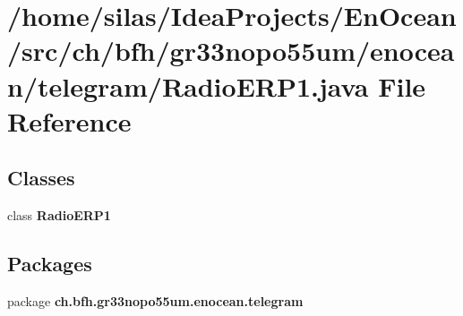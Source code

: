 \section{/home/silas/\+Idea\+Projects/\+En\+Ocean/src/ch/bfh/gr33nopo55um/enocean/telegram/\+Radio\+E\+R\+P1.java File Reference}
\label{RadioERP1_8java}
\subsection*{Classes}
\begin{DoxyCompactItemize}
\item 
class {\bf Radio\+E\+R\+P1}
\end{DoxyCompactItemize}
\subsection*{Packages}
\begin{DoxyCompactItemize}
\item 
package {\bf ch.\+bfh.\+gr33nopo55um.\+enocean.\+telegram}
\end{DoxyCompactItemize}
